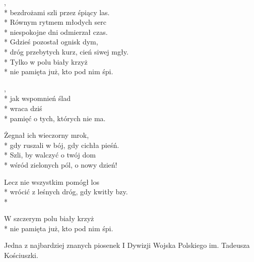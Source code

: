 \begin{lyrics}[longestline={dróg przebytych kurz, cień siwej mgły.}]

,\\*
bezdrożami szli przez śpiący las.\\*
Równym rytmem młodych serc\\*
niespokojne dni odmierzał czas.\\*
\smallskip
Gdzieś pozostał ognisk dym,\\*
dróg przebytych kurz, cień siwej mgły.\\*
Tylko w polu biały krzyż\\*
nie pamięta już, kto pod nim śpi.

\begin{chorus}
,\\*
jak wspomnień ślad\\*
wraca dziś\\*
pamięć o tych, których nie ma.
\end{chorus}

Żegnał ich wieczorny mrok,\\*
gdy ruszali w bój, gdy cichła pieśń.\\*
Szli, by walczyć o twój dom\\*
wśród zielonych pól, o nowy dzień!

\chorusref

Lecz nie wszystkim pomógł los\\*
wrócić z leśnych dróg, gdy kwitły bzy.\\*
\begin{markverses}[atwidthof={nie pamięta już, kto pod nim śpi.}]%
W szczerym polu biały krzyż\\*
nie pamięta już, kto pod nim śpi.
\end{markverses}
\end{lyrics}


\begin{info}Jedna z najbardziej znanych piosenek I Dywizji Wojska Polskiego im. Tadeusza Kościuszki.\end{info}

